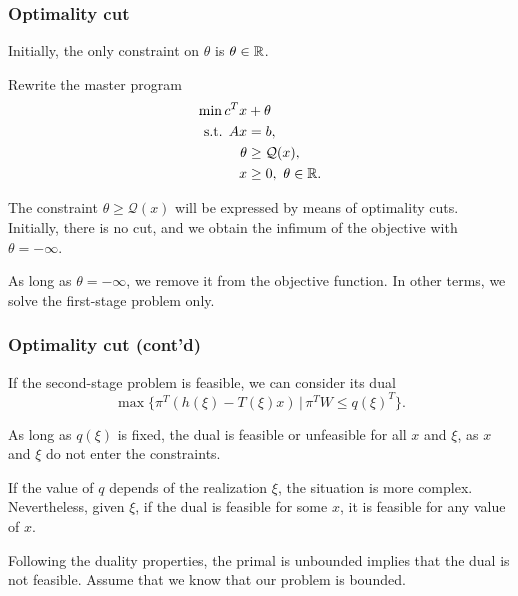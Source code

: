 \documentclass{beamer}
\begin{document}
\begin{frame}
\frametitle{Optimality cut}
	
Initially, the only constraint on $\theta$ is $\theta \in \mathbb{R}$.
	
\mbox{}
	
Rewrite the master program
\begin{align*}
\min c^Tx & + \theta \\
\mbox{s.t. } Ax & = b, \\
\theta &\geq \mathcal{Q}(x),\\
x & \geq 0,\ \theta \in \mathbb{R}.
\end{align*}
	
The constraint $\theta \geq \mathcal{Q}(x)$ will be expressed by means of optimality cuts.
Initially, there is no cut, and we obtain the infimum of the objective with $\theta = -\infty$.
	
\mbox{}
	
As long as $\theta = -\infty$, we remove it from the objective function.
In other terms, we solve the first-stage problem only.
	
\end{frame}

\begin{frame}
\frametitle{Optimality cut (cont'd)}
	
If {\red the second-stage problem is feasible}, we can consider its dual
\[
\max \lbrace \pi^T(h(\xi)-T(\xi)x) \,|\, \pi^TW \leq q(\xi)^T \rbrace.
\]
	
\mbox{}

As long as $q(\xi)$ is fixed, the dual is feasible or unfeasible for all $x$ and $\xi$, as $x$ and $\xi$ do not enter the constraints.
	
\mbox{}
	
If the value of $q$ depends of the realization $\xi$, the situation is more complex.
Nevertheless, given $\xi$, if the dual is feasible for some $x$, it is feasible for any value of $x$.
	
\mbox{}

Following the duality properties, the primal is unbounded implies that the dual is not feasible.
Assume that we know that our problem is bounded.
	
\end{frame}
\end{document}
